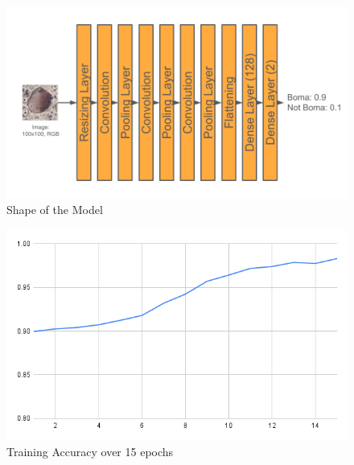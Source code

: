 \documentclass{article}
\begin{document}
\begin{figure}[H]
    \centering
    \includegraphics[width=1\linewidth]{images/Model Shape.png}
    \caption{Shape of the Model}
    \label{fig:model_shape}
\end{figure}

\begin{figure}[H]
    \centering
    \includegraphics[width=1\linewidth]{images/Training Accuracy over 15 epochs.png}
    \caption{Training Accuracy over 15 epochs}
    \label{fig:Training_Accuracy}
\end{figure}
\end{document}
